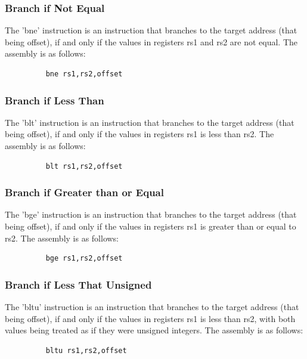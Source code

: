 \subsubsection{Branch if Not Equal}
\qquad
The 'bne' instruction is an instruction that branches to the target address (that being offset), if and only if the values in registers rs1 and rs2 are not equal. The assembly is as follows:
\begin{figure}[!htbp]
    \centering
    \begin{verbatim}
    bne rs1,rs2,offset
    \end{verbatim}
\end{figure}\newline

\subsubsection{Branch if Less Than}
\qquad
The 'blt' instruction is an instruction that branches to the target address (that being offset), if and only if the values in registers rs1 is less than rs2. The assembly is as follows:
\begin{figure}[!htbp]
    \centering
    \begin{verbatim}
    blt rs1,rs2,offset
    \end{verbatim}
\end{figure}\newline

\subsubsection{Branch if Greater than or Equal}
\qquad
The 'bge' instruction is an instruction that branches to the target address (that being offset), if and only if the values in registers rs1 is greater than or equal to rs2. The assembly is as follows:
\begin{figure}[!htbp]
    \centering
    \begin{verbatim}
    bge rs1,rs2,offset
    \end{verbatim}
\end{figure}\newline

\subsubsection{Branch if Less That Unsigned}
\qquad
The 'bltu' instruction is an instruction that branches to the target address (that being offset), if and only if the values in registers rs1 is less than rs2, with both values being treated as if they were unsigned integers. The assembly is as follows:
\begin{figure}[!htbp]
    \centering
    \begin{verbatim}
    bltu rs1,rs2,offset
    \end{verbatim}
\end{figure}\newline

